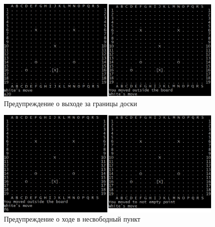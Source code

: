 \begin{figure}[H]
	\begin{center}
		\includegraphics[scale=0.6]{pics/GoCUI/Out.png}
	    \caption{Предупреждение о выходе за границы доски} 
		\label{pic:CUI_Out}
	\end{center}
\end{figure}

\begin{figure}[H]
	\begin{center}
		\includegraphics[scale=0.6]{pics/GoCUI/NotEmpty.png}
	    \caption{Предупреждение о ходе в несвободный пункт} 
		\label{pic:CUI_NotEmpty}
	\end{center}
\end{figure}


